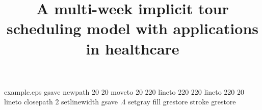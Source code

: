 %
%
%
%
%
\begin{filecontents*}{example.eps}
gsave
newpath
  20 20 moveto
  20 220 lineto
  220 220 lineto
  220 20 lineto
closepath
2 setlinewidth
gsave
  .4 setgray fill
grestore
stroke
grestore
\end{filecontents*}
%
\documentclass{article}
%
%
\usepackage{graphicx}
%
\usepackage{mathptmx}      %
%
\usepackage{amsmath, amssymb}
%
\newcommand{\nipar}{\par\noindent\ignorespaces}

%
%



\title{A multi-week implicit tour scheduling model with applications in healthcare
}


\author{
}


